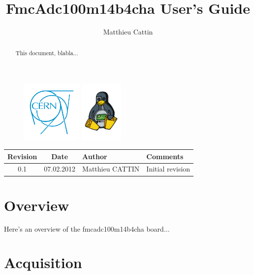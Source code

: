 \documentclass[11pt,a4paper]{article}
\title{FmcAdc100m14b4cha User's Guide}
\author{Matthieu Cattin}
\begin{document}
\begin{figure}[t]
  \includegraphics[height=3cm]{figures/cern_logo.pdf}
  \label{fig:cern_logo}
  \hfill
  \includegraphics[height=3cm]{figures/ohr_logo.pdf}
  \label{fig:ohr_logo}
\end{figure}

\maketitle

\begin{abstract}
This document, blabla...
\end{abstract}


\newpage
\begin{tabularx}{1.0\textwidth}{| c | c | l | X |}
\hline
Revision & Date & Author &  Comments\\
\hline
0.1 & 07.02.2012 & Matthieu CATTIN & Initial revision\\
\hline
\end{tabularx}

\newpage
\tableofcontents

\newpage

\section{Overview}
Here's an overview of the fmcadc100m14b4cha board...

\section{Acquisition}
\end{document}
